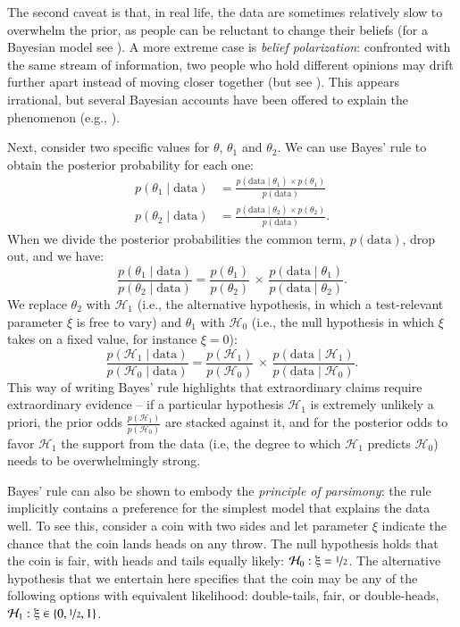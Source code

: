 \documentclass[man]{apa7}
\begin{document}
The second caveat is that, in real life, the data are sometimes relatively slow to overwhelm the prior, as people can be reluctant to change their beliefs (for a Bayesian model see \cite{Gershman2019}). A more extreme case is \emph{belief polarization}: confronted with the same stream of information, two people who hold different opinions may drift further apart instead of moving closer together (but see \cite{Anglin2019}). This appears irrational, but several Bayesian accounts have been offered to explain the phenomenon (e.g., \cite{CookLewandowsky2016,JernEtAl2014}).

Next, consider two specific values for $\theta$, $\theta_1$ and $\theta_2$. We can use Bayes' rule to obtain the posterior probability for each one:
\begin{align}
p(\theta_1 \mid \text{data})& =  \frac{p(\text{data} \mid \theta_1) \times p(\theta_1)}{p(\text{data})}\\
p(\theta_2 \mid \text{data})& =  \frac{p(\text{data} \mid \theta_2) \times p(\theta_2)}{p(\text{data})}.
\end{align}
When we divide the posterior probabilities the common term, $p(\text{data})$, drop out, and we have:
\begin{equation}
    \frac{p(\theta_1 \mid \text{data})}{p(\theta_2 \mid \text{data})} = \frac{p(\theta_1)}{p(\theta_2)} \, \times \, \frac{p(\text{data} \mid \theta_1)}{p(\text{data} \mid \theta_2)}.
\end{equation}
We replace $\theta_2$ with $\mathcal{H}_1$ (i.e., the alternative hypothesis, in which a test-relevant parameter $\xi$ is free to vary) and $\theta_1$ with $\mathcal{H}_0$ (i.e., the null hypothesis in which $\xi$ takes on a fixed value, for instance $\xi=0$):
\begin{equation}
    \frac{p(\mathcal{H}_1 \mid \text{data})}{p(\mathcal{H}_0 \mid \text{data})} = \frac{p(\mathcal{H}_1)}{p(\mathcal{H}_0)} \, \times \, \frac{p(\text{data} \mid \mathcal{H}_1)}{p(\text{data} \mid \mathcal{H}_0)}.
\end{equation}
This way of writing Bayes' rule highlights that extraordinary claims require extraordinary evidence -- if a particular hypothesis $\mathcal{H}_1$ is extremely unlikely a priori, the prior odds $\frac{p(\mathcal{H}_1)}{p(\mathcal{H}_0)}$ are stacked against it, and for the posterior odds to favor $\mathcal{H}_1$ the support from the data (i.e, the degree to which $\mathcal{H}_1$ predicts $\mathcal{H}_0$) needs to be overwhelmingly strong.   

Bayes' rule can also be shown to embody the \emph{principle of parsimony}: the rule implicitly contains a preference for the simplest model that explains the data well. To see this, consider a coin with two sides and let parameter $\xi$ indicate the chance that the coin lands heads on any throw. The null hypothesis holds that the coin is fair, with heads and tails equally likely: $\mathcal{H}_0: \xi = \nicefrac{1}{2}$. The alternative hypothesis that we entertain here specifies that the coin may be any of the following options with equivalent likelihood: double-tails, fair, or double-heads, $\mathcal{H}_1: \xi \in \{0, \nicefrac{1}{2}, 1\}$.
\end{document}
